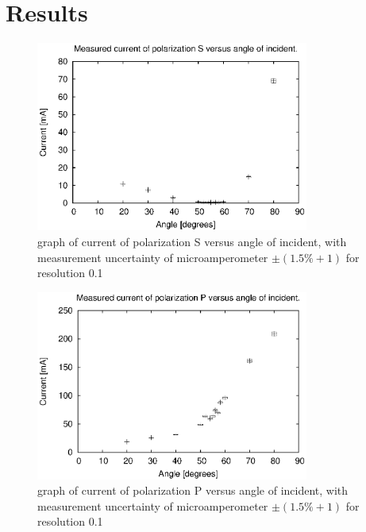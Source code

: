 \documentclass[a4paper,12pt]{article}
\begin{document}
\section{Results}

\begin{figure}[ht]
    \begin{center}
        \includegraphics[width=0.80\textwidth]{is}
        \caption{graph of current of polarization S versus angle of incident, with measurement uncertainty of microamperometer $\pm(1.5\% + 1)$ for resolution 0.1}
        \label{fig:is}
    \end{center}
\end{figure}

\begin{figure}[ht]
    \begin{center}
        \includegraphics[width=0.80\textwidth]{ip}
        \caption{graph of current of polarization P versus angle of incident, with measurement uncertainty of microamperometer $\pm(1.5\% + 1)$ for resolution 0.1}
        \label{fig:ip}
    \end{center}
\end{figure}
\end{document}
